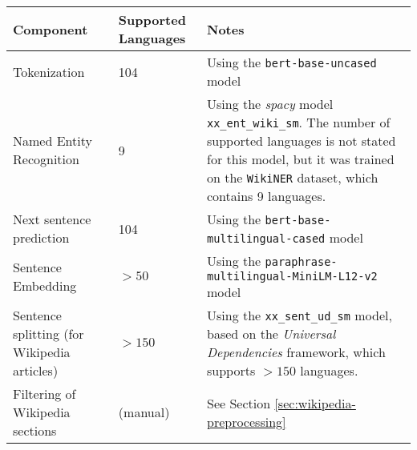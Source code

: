 {
\renewcommand{\arraystretch}{1.5}  %
\begin{table}[H]
	\centering
	\begin{tabularx}{\textwidth}{|X|X|X|}
		\hline
		\textbf{Component}                          & \textbf{Supported Languages} & \textbf{Notes}                                                                                                                                                                                                                             \\
		\hline
		Tokenization                                & 104                          & Using the \texttt{bert-base-uncased} model\footnotemark[1]                                                                                                                                                                                 \\
		\hline
		Named Entity Recognition                    & 9                            & Using the \textit{spacy} model \texttt{xx\_ent\_wiki\_sm}\footnotemark[2]. The number of supported languages is not stated for this model, but it was trained on the \texttt{WikiNER} dataset\footnotemark[3], which contains 9 languages. \\
		\hline
		Next sentence prediction                    & 104                          & Using the \texttt{bert-base-multilingual-cased} model\footnotemark[4]                                                                                                                                                                      \\
		\hline
		Sentence Embedding                          & $>50$                        & Using the \texttt{paraphrase-multilingual-MiniLM-L12-v2} model\footnotemark[5]                                                                                                                                                             \\
		\hline
		Sentence splitting (for Wikipedia articles) & $>150$                       & Using the \texttt{xx\_sent\_ud\_sm} model\footnotemark[6], based on the \textit{Universal Dependencies} framework\footnotemark[7], which supports $>150$ languages.                                                                        \\
		\hline
		Filtering of Wikipedia sections             & (manual)                     & See Section \ref{sec:wikipedia-preprocessing}                                                                                                                                                                                              \\

\end{tabularx}
\end{table}}
